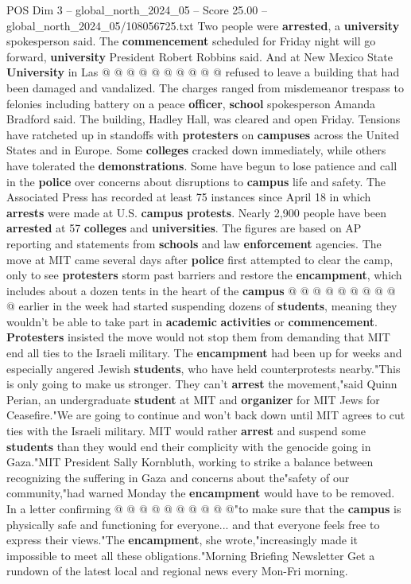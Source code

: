 \begin{textsample}{POS Dim 3 – global\_north\_2024\_05 – Score 25.00 – global\_north\_2024\_05/108056725.txt}
Two people were \textbf{arrested}, a \textbf{university} spokesperson said.
The \textbf{commencement} scheduled for Friday night will go forward, \textbf{university} President Robert Robbins said.
And at New Mexico State \textbf{University} in Las @ @ @ @ @ @ @ @ @ @ refused to leave a building that had been damaged and vandalized.
The charges ranged from misdemeanor trespass to felonies including battery on a peace \textbf{officer}, \textbf{school} spokesperson Amanda Bradford said.
The building, Hadley Hall, was cleared and open Friday.
Tensions have ratcheted up in standoffs with \textbf{protesters} on \textbf{campuses} across the United States and in Europe.
Some \textbf{colleges} cracked down immediately, while others have tolerated the \textbf{demonstrations}.
Some have begun to lose patience and call in the \textbf{police} over concerns about disruptions to \textbf{campus} life and safety.
The Associated Press has recorded at least 75 instances since April 18 in which \textbf{arrests} were made at U.S. \textbf{campus} \textbf{protests}.
Nearly 2,900 people have been \textbf{arrested} at 57 \textbf{colleges} and \textbf{universities}.
The figures are based on AP reporting and statements from \textbf{schools} and law \textbf{enforcement} agencies.
The move at MIT came several days after \textbf{police} first attempted to clear the camp, only to see \textbf{protesters} storm past barriers and restore the \textbf{encampment}, which includes about a dozen tents in the heart of the \textbf{campus} @ @ @ @ @ @ @ @ @ @ earlier in the week had started suspending dozens of \textbf{students}, meaning they wouldn't be able to take part in \textbf{academic} \textbf{activities} or \textbf{commencement}. \textbf{Protesters} insisted the move would not stop them from demanding that MIT end all ties to the Israeli military.
The \textbf{encampment} had been up for weeks and especially angered Jewish \textbf{students}, who have held counterprotests nearby."This is only going to make us stronger.
They can't \textbf{arrest} the movement,"said Quinn Perian, an undergraduate \textbf{student} at MIT and \textbf{organizer} for MIT Jews for Ceasefire."We are going to continue and won't back down until MIT agrees to cut ties with the Israeli military.
MIT would rather \textbf{arrest} and suspend some \textbf{students} than they would end their complicity with the genocide going in Gaza."MIT President Sally Kornbluth, working to strike a balance between recognizing the suffering in Gaza and concerns about the"safety of our community,"had warned Monday the \textbf{encampment} would have to be removed.
In a letter confirming @ @ @ @ @ @ @ @ @ @"to make sure that the \textbf{campus} is physically safe and functioning for everyone... and that everyone feels free to express their views."The \textbf{encampment}, she wrote,"increasingly made it impossible to meet all these obligations."Morning Briefing Newsletter Get a rundown of the latest local and regional news every Mon-Fri morning.


\end{textsample}
